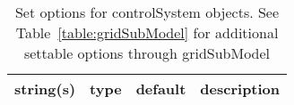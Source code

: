 \begin{table}[ht]
\centering
\begin{tabular}{p{5cm} c c p{7cm}}
\hline
string(s) & type & default & description \\
\hline
\hline
\end{tabular}
\caption{Set options for controlSystem objects. See Table~\ref{table:gridSubModel} for additional settable options through gridSubModel}
\label{table:controlSystem}
\end{table}

